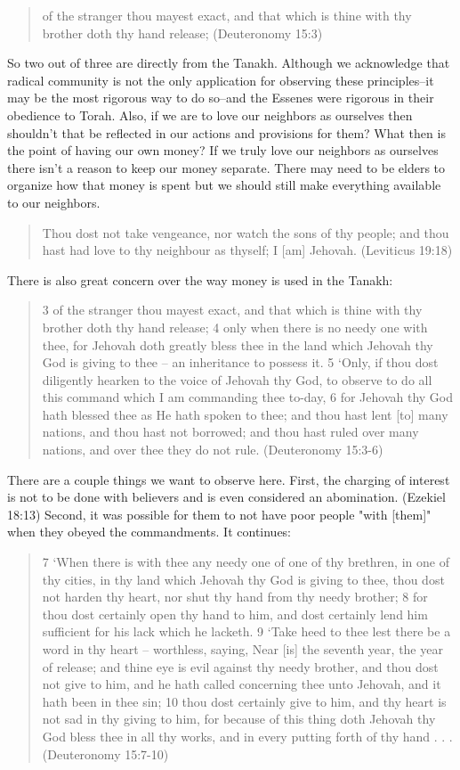 \documentclass[11pt]{article}
\begin{document}
\begin{quote}
of the stranger thou mayest exact, and that which is thine with thy brother doth thy hand release;
(Deuteronomy 15:3)
\end{quote}
So two out of three are directly from the Tanakh. Although we acknowledge that radical community is not the only application for observing these principles--it may be the most rigorous way to do so--and the Essenes were rigorous in their obedience to Torah. Also, if we are to love our neighbors as ourselves then shouldn't that be reflected in our actions and provisions for them? What then is the point of having our own money? If we truly love our neighbors as ourselves there isn't a reason to keep our money separate. There may need to be elders to organize how that money is spent but we should still make everything available to our neighbors. 
\begin{quote}
Thou dost not take vengeance, nor watch the sons of thy people; and thou hast had love to thy neighbour as thyself; I [am] Jehovah.
(Leviticus 19:18)
\end{quote}
There is also great concern over the way money is used in the Tanakh:
\begin{quote}
3 of the stranger thou mayest exact, and that which is thine with thy brother doth thy hand release;
4 only when there is no needy one with thee, for Jehovah doth greatly bless thee in the land which Jehovah thy God is giving to thee -- an inheritance to possess it.
5 `Only, if thou dost diligently hearken to the voice of Jehovah thy God, to observe to do all this command which I am commanding thee to-day,
6 for Jehovah thy God hath blessed thee as He hath spoken to thee; and thou hast lent [to] many nations, and thou hast not borrowed; and thou hast ruled over many nations, and over thee they do not rule. (Deuteronomy 15:3-6)
\end{quote}
There are a couple things we want to observe here. First, the charging of interest is not to be done with believers and is even considered an abomination. (Ezekiel 18:13) Second, it was possible for them to not have poor people "with [them]" when they obeyed the commandments. It continues:
\begin{quote}
7 `When there is with thee any needy one of one of thy brethren, in one of thy cities, in thy land which Jehovah thy God is giving to thee, thou dost not harden thy heart, nor shut thy hand from thy needy brother;
8 for thou dost certainly open thy hand to him, and dost certainly lend him sufficient for his lack which he lacketh.
9 `Take heed to thee lest there be a word in thy heart -- worthless, saying, Near [is] the seventh year, the year of release; and thine eye is evil against thy needy brother, and thou dost not give to him, and he hath called concerning thee unto Jehovah, and it hath been in thee sin;
10 thou dost certainly give to him, and thy heart is not sad in thy giving to him, for because of this thing doth Jehovah thy God bless thee in all thy works, and in every putting forth of thy hand . . . (Deuteronomy 15:7-10)
\end{quote}
\end{document}
